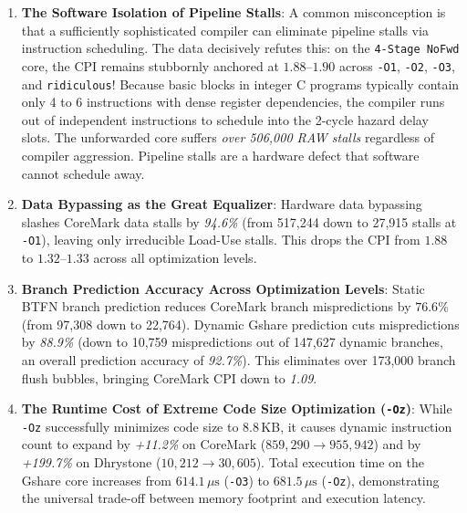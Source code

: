 \begin{enumerate}
    \item \textbf{The Software Isolation of Pipeline Stalls}:
    A common misconception is that a sufficiently sophisticated compiler can eliminate pipeline stalls via instruction scheduling. The data decisively refutes this: on the \texttt{4-Stage NoFwd} core, the CPI remains stubbornly anchored at $\mathbf{1.88\text{--}1.90}$ across \texttt{-O1}, \texttt{-O2}, \texttt{-O3}, and \texttt{ridiculous}! Because basic blocks in integer C programs typically contain only 4 to 6 instructions with dense register dependencies, the compiler runs out of independent instructions to schedule into the 2-cycle hazard delay slots. The unforwarded core suffers \textit{over 506,000 RAW stalls} regardless of compiler aggression. Pipeline stalls are a hardware defect that software cannot schedule away.
    
    \item \textbf{Data Bypassing as the Great Equalizer}:
    Hardware data bypassing slashes CoreMark data stalls by \textit{94.6\%} (from 517,244 down to 27,915 stalls at \texttt{-O1}), leaving only irreducible Load-Use stalls. This drops the CPI from $1.88$ to $1.32\text{--}1.33$ across all optimization levels.
    
    \item \textbf{Branch Prediction Accuracy Across Optimization Levels}:
    Static BTFN branch prediction reduces CoreMark branch mispredictions by $76.6\%$ (from 97,308 down to 22,764). Dynamic Gshare prediction cuts mispredictions by \textit{88.9\%} (down to 10,759 mispredictions out of 147,627 dynamic branches, an overall prediction accuracy of \textit{92.7\%}). This eliminates over 173,000 branch flush bubbles, bringing CoreMark CPI down to \textit{1.09}.
    
    \item \textbf{The Runtime Cost of Extreme Code Size Optimization (\texttt{-Oz})}:
    While \texttt{-Oz} successfully minimizes code size to 8.8\,KB, it causes dynamic instruction count to expand by \textit{+11.2\%} on CoreMark ($859,290 \to 955,942$) and by \textit{+199.7\%} on Dhrystone ($10,212 \to 30,605$). Total execution time on the Gshare core increases from $614.1\,\mu\text{s}$ (\texttt{-O3}) to $681.5\,\mu\text{s}$ (\texttt{-Oz}), demonstrating the universal trade-off between memory footprint and execution latency.
\end{enumerate}

